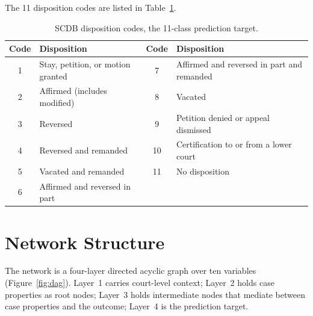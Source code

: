 \documentclass[11pt]{article}
\begin{document}
The 11 disposition codes are listed in Table~\ref{tab:dispositions}.

\begin{table}[t]
\centering
\caption{SCDB disposition codes, the 11-class prediction target.}
\label{tab:dispositions}
\footnotesize
\setlength{\tabcolsep}{4pt}
\begin{tabular}{cl@{\hskip 1em}cl}
\toprule
Code & Disposition & Code & Disposition \\
\midrule
1 & Stay, petition, or motion granted   & 7  & Affirmed and reversed in part and remanded \\
2 & Affirmed (includes modified)        & 8  & Vacated \\
3 & Reversed                            & 9  & Petition denied or appeal dismissed \\
4 & Reversed and remanded               & 10 & Certification to or from a lower court \\
5 & Vacated and remanded                & 11 & No disposition \\
6 & Affirmed and reversed in part       &    & \\
\bottomrule
\end{tabular}
\end{table}

\section{Network Structure}

The network is a four-layer directed acyclic graph over ten variables
(Figure~\ref{fig:dag}). Layer~1 carries court-level context; Layer~2 holds case
properties as root nodes; Layer~3 holds intermediate nodes that mediate between
case properties and the outcome; Layer~4 is the prediction target.
\end{document}
